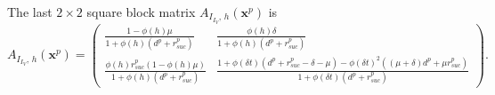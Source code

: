 \documentclass[a4paper]{article}
\newcommand{\varpiVar}{r_{suc}}
\begin{document}
{\noindent The last $2\times 2$ square block matrix $A_{I_{I_V},\,h}(\mathbf x^p)$ is $$A_{I_{I_V},\,h}(\mathbf x^p) = \begin{pmatrix}\frac{1-\phi(h)\mu}{1+ \phi(h)(d^p+\varpiVar ^p)} & \frac{\phi(h)\delta}{1+ \phi(h)(d^p+\varpiVar ^p)}\\\frac{\phi(h)\varpiVar ^p(1-\phi(h)\mu)}{1+ \phi(h)(d^p+\varpiVar ^p)} & \frac{1+ \phi(\delta t)(d^p+\varpiVar ^p-\delta-\mu) -  {\phi(\delta t)}^2((\mu+\delta) d^p+\mu\varpiVar ^{p}) }{1+\phi(\delta t)(d^{p}+\varpiVar ^{p})}\end{pmatrix}.$$ 


}
\end{document}
